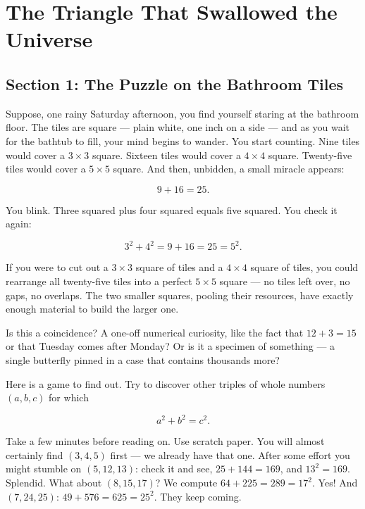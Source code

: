 \chapter*{The Triangle That Swallowed the Universe}



\section*{Section 1: The Puzzle on the Bathroom Tiles}

Suppose, one rainy Saturday afternoon, you find yourself staring at the bathroom floor. The tiles are square --- plain white, one inch on a side --- and as you wait for the bathtub to fill, your mind begins to wander. You start counting. Nine tiles would cover a $3 \times 3$ square. Sixteen tiles would cover a $4 \times 4$ square. Twenty-five tiles would cover a $5 \times 5$ square. And then, unbidden, a small miracle appears:

\[
9 + 16 = 25.
\]

You blink. Three squared plus four squared equals five squared. You check it again:

\[
3^2 + 4^2 = 9 + 16 = 25 = 5^2.
\]

If you were to cut out a $3 \times 3$ square of tiles and a $4 \times 4$ square of tiles, you could rearrange all twenty-five tiles into a perfect $5 \times 5$ square --- no tiles left over, no gaps, no overlaps. The two smaller squares, pooling their resources, have exactly enough material to build the larger one.

Is this a coincidence? A one-off numerical curiosity, like the fact that $12 + 3 = 15$ or that Tuesday comes after Monday? Or is it a specimen of something --- a single butterfly pinned in a case that contains thousands more?

Here is a game to find out. Try to discover other triples of whole numbers $(a, b, c)$ for which

\[
a^2 + b^2 = c^2.
\]

Take a few minutes before reading on. Use scratch paper. You will almost certainly find $(3, 4, 5)$ first --- we already have that one. After some effort you might stumble on $(5, 12, 13)$: check it and see, $25 + 144 = 169$, and $13^2 = 169$. Splendid. What about $(8, 15, 17)$? We compute $64 + 225 = 289 = 17^2$. Yes! And $(7, 24, 25)$: $49 + 576 = 625 = 25^2$. They keep coming.


